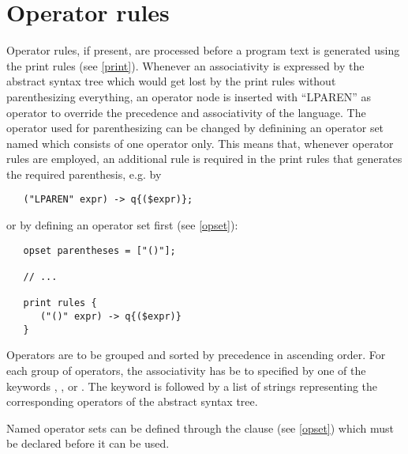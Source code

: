 \chapter{Operator rules}\label{oprules}
Operator rules, if present, are processed before a program text
is generated using the print rules (see \ref{print}). Whenever an
associativity is expressed by the abstract syntax
tree which would get lost by the print rules without parenthesizing
everything, an operator node is inserted with ``LPAREN''
as operator to override the precedence and associativity of the
language. The operator used for parenthesizing can be changed by
definining an operator set named 
which consists of one operator only. This means that, whenever operator
rules are employed, an additional rule is required in the print rules
that generates the required parenthesis, e.g. by

\begin{lstlisting}
   ("LPAREN" expr) -> q{($expr)};
\end{lstlisting}%

\noindent
or by defining an operator set first (see \ref{opset}):

\begin{lstlisting}
   opset parentheses = ["()"];

   // ...

   print rules {
      ("()" expr) -> q{($expr)}
   }
\end{lstlisting}%

\noindent
Operators are to be grouped and sorted by precedence
in ascending order. For each group of operators, the associativity has
be to specified by one of the keywords , ,
or . The keyword is followed by a list of strings
representing the corresponding operators of the abstract syntax tree.

Named operator sets can be defined through the  clause
(see \ref{opset}) which must be declared before it can be used.

